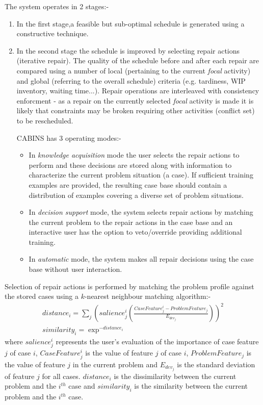 The system operates in 2 stages:-
\begin{enumerate}
\item In the first stage,a feasible but sub-optimal schedule is generated using a constructive technique. 
\item In the second stage the schedule is improved by selecting repair actions (iterative repair). The quality of the schedule before and after each repair are compared using a number of local (pertaining to the current \emph{focal} activity) and global (referring to the overall schedule) criteria (e.g. tardiness, WIP inventory, waiting time...). Repair operations are interleaved with consistency enforcment - as a repair on the currently selected \emph{focal} activity is made it is likely that constraints may be broken requiring other activities (conflict set) to be rescheduled. 

CABINS has 3 operating modes:-
\begin{itemize}
\item In \emph{knowledge acquisition} mode the user selects the repair actions to perform and these decisions are stored along with information to characterize the current problem situation (a case). If sufficient training examples are provided, the resulting case base should contain a distribution of examples covering a diverse set of problem situations.

\item In \emph{decision support} mode, the system selects repair actions by matching the current problem to the repair actions in the case base and an interactive user has the option to veto/override providing additional training.

\item In \emph{automatic} mode, the system makes all repair decisions using the case base without user interaction.
\end{itemize}
\end{enumerate}

Selection of repair actions is performed by matching the problem profile against the stored cases using a $k$-nearest neighbour matching algorithm:-
\begin{eqnarray}
distance_i = \sum_j (salience^i_j (\frac {CaseFeature^i_j - ProblemFeature_j}{E_{dev_j}}))^2 \\
similarity_i = \exp^{-distance_i}
\end{eqnarray}
where $salience^i_j$ represents the user's evaluation of the importance of case feature $j$ of case $i$, $CaseFeature^i_j$ is the value of feature $j$ of case $i$, $ProblemFeature_j$ is the value of feature $j$ in the current problem and 
$E_{dev_j}$ is the standard deviation of feature $j$ for all cases. $distance_i$ is the dissimilarity between the current problem and the $i^{th}$ case and $similarity_i$ is the similarity between the current problem and the $i^{th}$ case.

